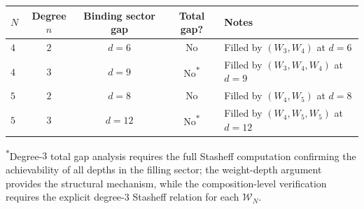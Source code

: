 \begin{computation}
\label{comp:w4-w5-gap-verification}
%
\begin{center}
\small
\renewcommand{\arraystretch}{1.3}
\begin{tabular}{lcccl}
\toprule
$N$ & Degree $n$ & Binding sector gap
 & Total gap? & Notes \\
\midrule
$4$ & $2$ & $d = 6$
 & No
 & Filled by $(W_3, W_4)$ at $d = 6$ \\
$4$ & $3$ & $d = 9$
 & No\textsuperscript{$*$}
 & Filled by $(W_3, W_4, W_4)$ at $d = 9$ \\
$5$ & $2$ & $d = 8$
 & No
 & Filled by $(W_4, W_5)$ at $d = 8$ \\
$5$ & $3$ & $d = 12$
 & No\textsuperscript{$*$}
 & Filled by $(W_4, W_5, W_5)$ at $d = 12$ \\
\bottomrule
\end{tabular}
\end{center}
\noindent \textsuperscript{$*$}Degree-$3$ total gap
analysis requires the full Stasheff computation
confirming the achievability of all depths in the
filling sector; the weight-depth argument provides
the structural mechanism, while the composition-level
verification requires the explicit degree-$3$ Stasheff
relation for each $\mathcal{W}_N$.
\end{computation}

